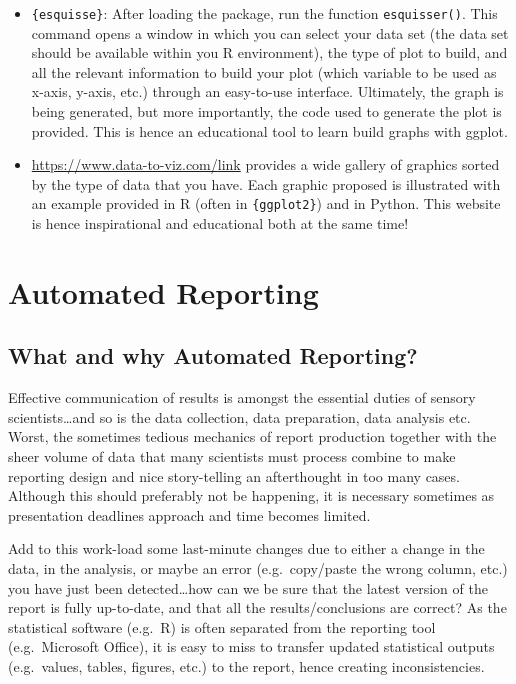 \documentclass[
]{book}
\providecommand{\tightlist}{%
  \setlength{\itemsep}{0pt}\setlength{\parskip}{0pt}}
\begin{document}
\begin{itemize}
\tightlist
\item
  \texttt{\{esquisse\}}: After loading the package, run the function \texttt{esquisser()}. This command opens a window in which you can select your data set (the data set should be available within you R environment), the type of plot to build, and all the relevant information to build your plot (which variable to be used as x-axis, y-axis, etc.) through an easy-to-use interface. Ultimately, the graph is being generated, but more importantly, the code used to generate the plot is provided. This is hence an educational tool to learn build graphs with ggplot.
\item
  \url{https://www.data-to-viz.com/}\href{https://www.data-to-viz.com/}{link} provides a wide gallery of graphics sorted by the type of data that you have. Each graphic proposed is illustrated with an example provided in R (often in \texttt{\{ggplot2\}}) and in Python. This website is hence inspirational and educational both at the same time!
\end{itemize}

\hypertarget{auto-report}{%
\chapter{Automated Reporting}\label{auto-report}}

\hypertarget{what-and-why-automated-reporting}{%
\section{What and why Automated Reporting?}\label{what-and-why-automated-reporting}}

Effective communication of results is amongst the essential duties of sensory scientists\ldots and so is the data collection, data preparation, data analysis etc. Worst, the sometimes tedious mechanics of report production together with the sheer volume of data that many scientists must process combine to make reporting design and nice story-telling an afterthought in too many cases.
Although this should preferably not be happening, it is necessary sometimes as presentation deadlines approach and time becomes limited.

Add to this work-load some last-minute changes due to either a change in the data, in the analysis, or maybe an error (e.g.~copy/paste the wrong column, etc.) you have just been detected\ldots how can we be sure that the latest version of the report is fully up-to-date, and that all the results/conclusions are correct? As the statistical software (e.g.~R) is often separated from the reporting tool (e.g.~Microsoft Office), it is easy to miss to transfer updated statistical outputs (e.g.~values, tables, figures, etc.) to the report, hence creating inconsistencies.
\end{document}
